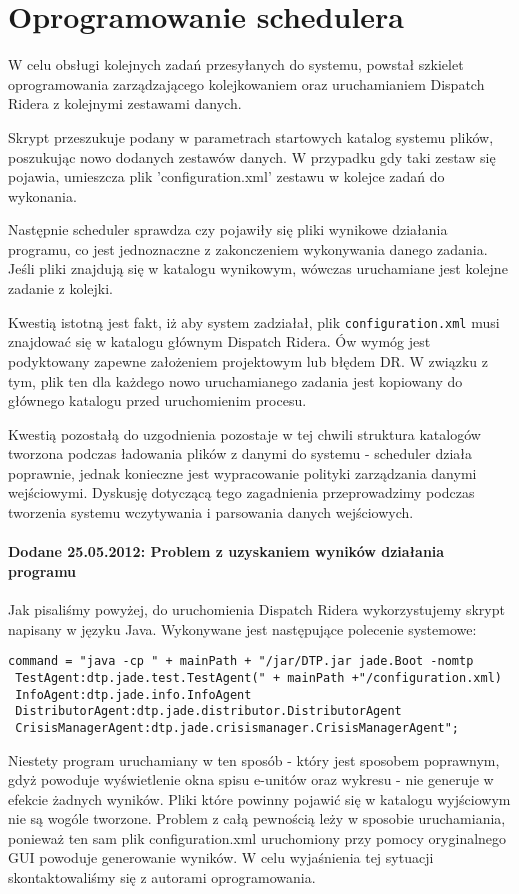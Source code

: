 \lstset{language=Java}
\chapter{Oprogramowanie schedulera}
W celu obsługi kolejnych zadań przesyłanych do systemu, powstał szkielet oprogramowania zarządzającego kolejkowaniem oraz uruchamianiem Dispatch Ridera z kolejnymi zestawami danych.


Skrypt przeszukuje podany w parametrach startowych katalog systemu plików, poszukując nowo dodanych zestawów danych. W przypadku gdy taki zestaw się pojawia, umieszcza plik 'configuration.xml' zestawu w kolejce zadań do wykonania.


Następnie scheduler sprawdza czy pojawiły się pliki wynikowe działania programu, co jest jednoznaczne z zakonczeniem wykonywania danego zadania. Jeśli pliki znajdują się w katalogu wynikowym, wówczas uruchamiane jest kolejne zadanie z kolejki. 


Kwestią istotną jest fakt, iż aby system zadziałał, plik \texttt{configuration.xml} musi znajdować się w katalogu głównym Dispatch Ridera. Ów wymóg jest podyktowany zapewne założeniem projektowym lub błędem DR. W związku z tym, plik ten dla każdego nowo uruchamianego zadania jest kopiowany do głównego katalogu przed uruchomienim procesu. 


Kwestią pozostałą do uzgodnienia pozostaje w tej chwili struktura katalogów tworzona podczas ładowania plików z danymi do systemu - scheduler działa poprawnie, jednak konieczne jest wypracowanie polityki zarządzania danymi wejściowymi. Dyskusję dotyczącą tego zagadnienia przeprowadzimy podczas tworzenia systemu wczytywania i parsowania danych wejściowych.




\subsubsection{Dodane 25.05.2012: Problem z uzyskaniem wyników działania programu}

Jak pisaliśmy powyżej, do uruchomienia Dispatch Ridera wykorzystujemy skrypt napisany w języku Java. Wykonywane jest następujące polecenie systemowe:

\begin{verbatim}
command = "java -cp " + mainPath + "/jar/DTP.jar jade.Boot -nomtp
 TestAgent:dtp.jade.test.TestAgent(" + mainPath +"/configuration.xml)
 InfoAgent:dtp.jade.info.InfoAgent
 DistributorAgent:dtp.jade.distributor.DistributorAgent
 CrisisManagerAgent:dtp.jade.crisismanager.CrisisManagerAgent";
\end{verbatim}

Niestety program uruchamiany w ten sposób - który jest sposobem poprawnym, gdyż powoduje wyświetlenie okna spisu e-unitów oraz wykresu - nie generuje w efekcie żadnych wyników. Pliki które powinny pojawić się w katalogu wyjściowym nie są wogóle tworzone. Problem z całą pewnością leży w sposobie uruchamiania, ponieważ ten sam plik configuration.xml uruchomiony przy pomocy oryginalnego GUI powoduje generowanie wyników. W celu wyjaśnienia tej sytuacji skontaktowaliśmy się z autorami oprogramowania.